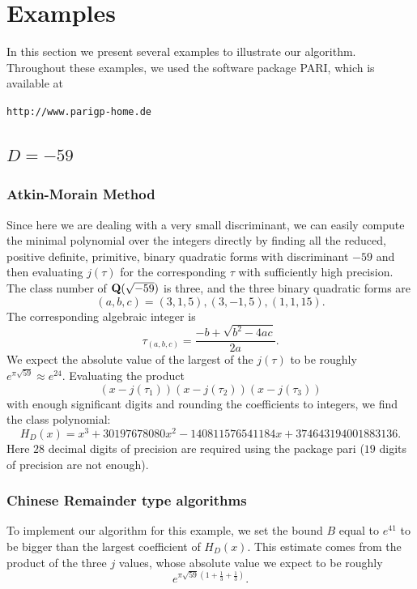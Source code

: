 \documentclass{amsart}
\newcommand{\Q}{{\bf{Q}}}
\theoremstyle{plain}
\begin{document}
\section{Examples} \label{examples}

In this section we present several examples to illustrate 
our algorithm.  Throughout these examples, we used the software package PARI, which is
available at 
\begin{center}
{\tt http://www.parigp-home.de}
\end{center}

\subsection{$D= -59$}
\subsubsection{Atkin-Morain Method}
Since here we are dealing with a very small discriminant, we can easily
compute the minimal polynomial over the integers directly by finding all the
reduced, positive definite, primitive, binary quadratic forms with 
discriminant $-59$ and then evaluating $j(\tau)$ for the corresponding $\tau$ 
with sufficiently high precision.  The class number of $\Q(\sqrt{-59})$ is three,
and the three binary quadratic forms are 
$$(a,b,c) = (3,1,5), (3,-1,5), (1,1,15).$$
The corresponding algebraic integer is 
$$\tau_{(a,b,c)} = \frac{-b + \sqrt{b^2-4ac}}{2a}.$$
We expect the absolute value of the largest of the $j(\tau)$
to be roughly $e^{\pi\sqrt{59}} \approx e^{24}$.
Evaluating the product $$(x-j(\tau_1))(x-j(\tau_2))(x-j(\tau_3))$$
with enough significant digits and rounding the coefficients
to integers, we find the class polynomial:
$$H_D(x) =  x^3 + 30197678080x^2 - 140811576541184x + 374643194001883136.$$
Here $28$ decimal digits of precision are required using the 
package pari ($19$ digits of precision are not enough).

\subsubsection{Chinese Remainder type algorithms}
To implement our algorithm for this example, we set the bound
$B$ equal to $e^{41}$ to be bigger than the largest 
coefficient of $H_D(x)$.  This estimate comes from the product
of the three $j$ values, whose absolute value we expect to be
roughly $$e^{\pi\sqrt{59}(1+\frac{1}{3}+\frac{1}{3})}.$$
\end{document}
